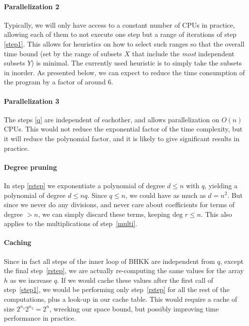 \documentclass{cslthse-msc}
\begin{document}
\paragraph{Parallelization 2}\label{parallelization2} Typically, we will only have access to a constant number of CPUs in practice, allowing each of them to not execute one step but a range of iterations of step \ref{step1}. This allows for heuristics on how to select such ranges so that the overall time bound (set by the range of subsets $X$ that include the \emph{most} independent subsets $Y$) is minimal. The currently used heuristic is to simply take the subsets in inorder. As presented below, we can expect to reduce the time consumption of the program by a factor of around 6.

\paragraph{Parallelization 3} The steps \ref{q} are independent of eachother, and allows parallelization on $O(n)$ CPUs. This would not reduce the exponential factor of the time complexity, but it will reduce the polynomial factor, and it is likely to give significant results in practice.

\paragraph{Degree pruning} In step \ref{rstep} we exponentiate a polynomial of degree $d \leq n$ with $q$, yielding a polynomial of degree $d \leq nq$. Since $q \leq n$, we could have as much as $d = n^2$. But since we never do any divisions, and never care about coefficients for terms of degree $> n$, we can simply discard these terms, keeping $\text{deg } r \leq n$. This also applies to the multiplications of step~\ref{multi}.

\paragraph{Caching} Since in fact all steps of the inner loop of BHKK are independent from $q$, except the final step~\ref{rstep}, we are actually re-computing the same values for the array $h$ as we increase $q$. If we would cache these values after the first call of step~\ref{step1}, we would be performing only step~\ref{rstep} for all the rest of the computations, plus a look-up in our cache table. This would require a cache of size $2^{n_1} 2^{n_2} = 2^n$, wrecking our space bound, but possibly improving time performance in practice.
\end{document}

